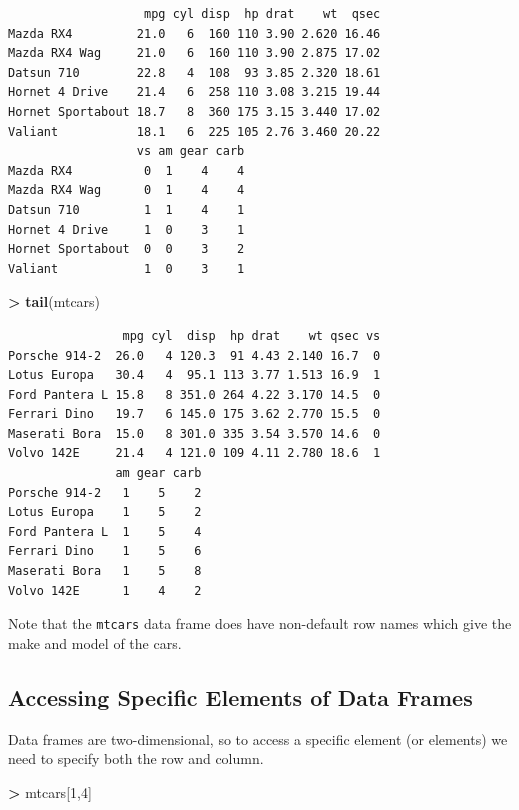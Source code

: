 \documentclass[
]{krantz}
\makeatletter
\newenvironment{Shaded}{\begin{snugshade}}{\end{snugshade}}
\newcommand{\DecValTok}[1]{\textcolor[rgb]{0.06,0.06,0.06}{#1}}
\newcommand{\KeywordTok}[1]{\textcolor[rgb]{0.27,0.27,0.27}{\textbf{#1}}}
\newcommand{\NormalTok}[1]{#1}
\newcommand{\OperatorTok}[1]{\textcolor[rgb]{0.43,0.43,0.43}{\textbf{#1}}}
\newcommand{\StringTok}[1]{\textcolor[rgb]{0.5,0.5,0.5}{#1}}
\newenvironment{kframe}{%
\medskip{}
\setlength{\fboxsep}{.8em}
 \def\at@end@of@kframe{}%
 \ifinner\ifhmode%
  \def\at@end@of@kframe{\end{minipage}}%
  \begin{minipage}{\columnwidth}%
 \fi\fi%
 \def\FrameCommand##1{\hskip\@totalleftmargin \hskip-\fboxsep
 \colorbox{shadecolor}{##1}\hskip-\fboxsep
     \hskip-\linewidth \hskip-\@totalleftmargin \hskip\columnwidth}%
 \MakeFramed {\advance\hsize-\width
   \@totalleftmargin\z@ \linewidth\hsize
   \@setminipage}}%
 {\par\unskip\endMakeFramed%
 \at@end@of@kframe}
\renewenvironment{Shaded}{\begin{kframe}}{\end{kframe}}
\makeatother
\begin{document}
\begin{verbatim}
                   mpg cyl disp  hp drat    wt  qsec
Mazda RX4         21.0   6  160 110 3.90 2.620 16.46
Mazda RX4 Wag     21.0   6  160 110 3.90 2.875 17.02
Datsun 710        22.8   4  108  93 3.85 2.320 18.61
Hornet 4 Drive    21.4   6  258 110 3.08 3.215 19.44
Hornet Sportabout 18.7   8  360 175 3.15 3.440 17.02
Valiant           18.1   6  225 105 2.76 3.460 20.22
                  vs am gear carb
Mazda RX4          0  1    4    4
Mazda RX4 Wag      0  1    4    4
Datsun 710         1  1    4    1
Hornet 4 Drive     1  0    3    1
Hornet Sportabout  0  0    3    2
Valiant            1  0    3    1
\end{verbatim}

\begin{Shaded}
\begin{Highlighting}[]
\OperatorTok{\textgreater{}}\StringTok{ }\KeywordTok{tail}\NormalTok{(mtcars)}
\end{Highlighting}
\end{Shaded}

\begin{verbatim}
                mpg cyl  disp  hp drat    wt qsec vs
Porsche 914-2  26.0   4 120.3  91 4.43 2.140 16.7  0
Lotus Europa   30.4   4  95.1 113 3.77 1.513 16.9  1
Ford Pantera L 15.8   8 351.0 264 4.22 3.170 14.5  0
Ferrari Dino   19.7   6 145.0 175 3.62 2.770 15.5  0
Maserati Bora  15.0   8 301.0 335 3.54 3.570 14.6  0
Volvo 142E     21.4   4 121.0 109 4.11 2.780 18.6  1
               am gear carb
Porsche 914-2   1    5    2
Lotus Europa    1    5    2
Ford Pantera L  1    5    4
Ferrari Dino    1    5    6
Maserati Bora   1    5    8
Volvo 142E      1    4    2
\end{verbatim}

Note that the \texttt{mtcars} data frame does have non-default row names which give the make and model of the cars.

\hypertarget{accessing-specific-elements-of-data-frames}{%
\subsection{Accessing Specific Elements of Data Frames}\label{accessing-specific-elements-of-data-frames}}

Data frames are two-dimensional, so to access a specific element (or elements) we need to specify both the row and column.

\begin{Shaded}
\begin{Highlighting}[]
\OperatorTok{\textgreater{}}\StringTok{ }\NormalTok{mtcars[}\DecValTok{1}\NormalTok{,}\DecValTok{4}\NormalTok{]}
\end{Highlighting}
\end{Shaded}
\end{document}
